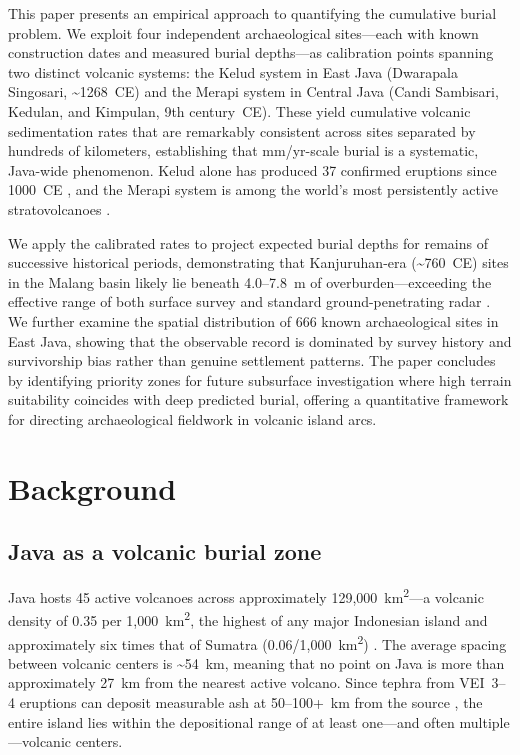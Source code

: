 \documentclass[12pt,a4paper]{article}
\begin{document}
This paper presents an empirical approach to quantifying the cumulative burial problem. We exploit four independent archaeological sites---each with known construction dates and measured burial depths---as calibration points spanning two distinct volcanic systems: the Kelud system in East Java (Dwarapala Singosari, \textasciitilde1268~CE) and the Merapi system in Central Java (Candi Sambisari, Kedulan, and Kimpulan, 9th century~CE). These yield cumulative volcanic sedimentation rates that are remarkably consistent across sites separated by hundreds of kilometers, establishing that mm/yr-scale burial is a systematic, Java-wide phenomenon. Kelud alone has produced 37 confirmed eruptions since 1000~CE \citep{gvp2024}, and the Merapi system is among the world's most persistently active stratovolcanoes \citep{gertisser2012}.

We apply the calibrated rates to project expected burial depths for remains of successive historical periods, demonstrating that Kanjuruhan-era (\textasciitilde760~CE) sites in the Malang basin likely lie beneath 4.0--7.8~m of overburden---exceeding the effective range of both surface survey and standard ground-penetrating radar \citep{putra2019}. We further examine the spatial distribution of 666 known archaeological sites in East Java, showing that the observable record is dominated by survey history and survivorship bias rather than genuine settlement patterns. The paper concludes by identifying priority zones for future subsurface investigation where high terrain suitability coincides with deep predicted burial, offering a quantitative framework for directing archaeological fieldwork in volcanic island arcs.

\section{Background}

\subsection{Java as a volcanic burial zone}

Java hosts 45 active volcanoes across approximately 129,000~km\textsuperscript{2}---a volcanic density of 0.35 per 1,000~km\textsuperscript{2}, the highest of any major Indonesian island and approximately six times that of Sumatra (0.06/1,000~km\textsuperscript{2}) \citep{vanbemmelen1949}. The average spacing between volcanic centers is \textasciitilde54~km, meaning that no point on Java is more than approximately 27~km from the nearest active volcano. Since tephra from VEI~3--4 eruptions can deposit measurable ash at 50--100+~km from the source \citep{newhall1982}, the entire island lies within the depositional range of at least one---and often multiple---volcanic centers.
\end{document}
